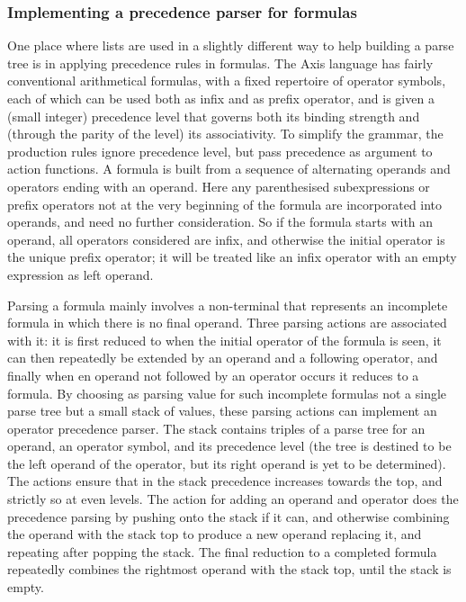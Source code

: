 \documentclass[12pt]{article}
\theoremstyle{plain}
\theoremstyle{definition}
\begin{document}
\subsubsection{Implementing a precedence parser for formulas}

One place where lists are used in a slightly different way to help building a
parse tree is in applying precedence rules in formulas. The Axis language has
fairly conventional arithmetical formulas, with a fixed repertoire of operator
symbols, each of which can be used both as infix and as prefix operator, and is
given a (small integer) precedence level that governs both its binding strength
and (through the parity of the level) its associativity. To simplify the
grammar, the production rules ignore precedence level, but pass precedence as
argument to action functions. A formula is built from a sequence of alternating
operands and operators ending with an operand. Here any parenthesised
subexpressions or prefix operators not at the very beginning of the formula are
incorporated into operands, and need no further consideration. So if the formula
starts with an operand, all operators considered are infix, and otherwise the
initial operator is the unique prefix operator; it will be treated like an infix
operator with an empty expression as left operand.

Parsing a formula mainly involves a non-terminal that represents an incomplete
formula in which there is no final operand. Three parsing actions are associated
with it: it is first reduced to when the initial operator of the formula is
seen, it can then repeatedly be extended by an operand and a following operator,
and finally when en operand not followed by an operator occurs it reduces to a
formula. By choosing as parsing value for such incomplete formulas not a single
parse tree but a small stack of values, these parsing actions can implement an
operator precedence parser. The stack contains triples of a parse tree for an
operand, an operator symbol, and its precedence level (the tree is destined to
be the left operand of the operator, but its right operand is yet to be
determined). The actions ensure that in the stack precedence increases towards
the top, and strictly so at even levels. The action for adding an operand and
operator does the precedence parsing by pushing onto the stack if it can, and
otherwise combining the operand with the stack top to produce a new operand
replacing it, and repeating after popping the stack. The final reduction to a
completed formula repeatedly combines the rightmost operand with the stack top,
until the stack is empty.
\end{document}
